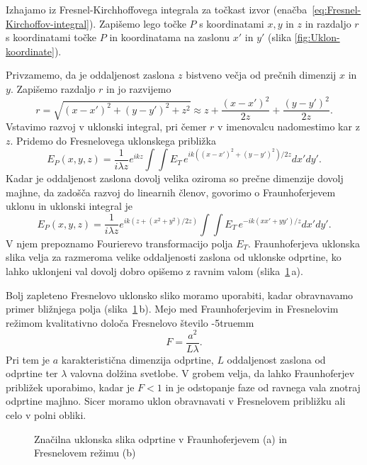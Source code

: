 Izhajamo iz Fresnel-Kirchhoffovega integrala za točkast izvor
(enačba~\ref{eq:Fresnel-Kirchoffov-integral}). Zapišemo 
lego točke $P$ s koordinatami $x,y$ in $z$ in razdaljo $r$ 
s koordinatami točke $P$ in koordinatama na zaslonu $x'$ in $y'$ 
 (slika \ref{fig:Uklon-koordinate}). 
 
 Privzamemo,
da je oddaljenost zaslona $z$ bistveno večja od prečnih dimenzij $x$ in $y$. 
Zapišemo razdaljo $r$ in jo razvijemo
\begin{equation}
r = \sqrt{(x-x')^2+(y-y')^2 + z^2} \approx z + \frac{(x-x')^2}{2z} +\frac{(y-y')^2}{2z}.
\end{equation}
Vstavimo razvoj v uklonski integral, pri 
čemer $r$ v imenovalcu nadomestimo kar z $z$. Pridemo do Fresnelovega uklonskega približka 
\begin{equation}
\label{eq:FresnelApprox}
E_P(x,y,z) =  \frac{1}{i \lambda z } e^{i k z}\int \int E_T\, e^{ik ((x-x')^2+(y-y')^2)/2z} dx' dy'.
\end{equation}
Kadar je oddaljenost zaslona dovolj velika oziroma so prečne dimenzije dovolj majhne, da zadošča 
razvoj do linearnih členov, govorimo o Fraunhoferjevem uklonu in uklonski integral je
\begin{equation}
\label{eq:FraunhoferApprox}
E_P(x,y,z) =  \frac{1}{i\lambda z} e^{i k (z + (x^2+y^2) /2z)}\int \int E_T\,
e^{-ik (xx'+yy')/z} dx' dy'.
\end{equation}
V njem  prepoznamo Fourierevo transformacijo polja $E_T$.
Fraunhoferjeva uklonska slika velja za razmeroma velike oddaljenosti
zaslona od uklonske odprtine, ko lahko uklonjeni val dovolj dobro opišemo z ravnim valom
(slika~\ref{fig:UklonFF}\,a). 

Bolj zapleteno Fresnelovo uklonsko sliko moramo uporabiti, kadar obravnavamo 
primer bližnjega polja (slika~\ref{fig:UklonFF}\,b). 
Mejo med Fraunhoferjevim in Fresnelovim režimom kvalitativno določa Fresnelovo
število
\vglue-5truemm
\begin{equation}
F= \frac{a^2}{L\lambda}.
\label{eq:Fst}
\end{equation} 
Pri tem je $a$ karakteristična dimenzija odprtine, $L$ oddaljenost zaslona 
od odprtine ter $\lambda$ valovna dolžina svetlobe. V grobem velja, da lahko 
Fraunhoferjev približek uporabimo, kadar je $F<1$ in je odstopanje faze od ravnega vala 
znotraj odprtine majhno. Sicer moramo uklon obravnavati v Fresnelovem približku ali 
celo v polni obliki. 

\begin{figure}[h]
 \centering {} 
  
\caption{Značilna uklonska slika odprtine v Fraunhoferjevem (a) in Fresnelovem režimu (b)}
\label{fig:UklonFF}
\end{figure}

